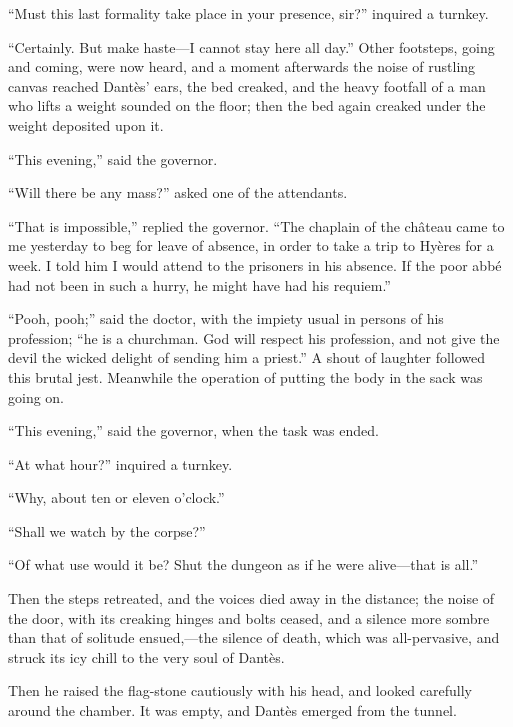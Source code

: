 “Must this last formality take place in your presence, sir?” inquired a
turnkey.

“Certainly. But make haste—I cannot stay here all day.” Other
footsteps, going and coming, were now heard, and a moment afterwards
the noise of rustling canvas reached Dantès’ ears, the bed creaked, and
the heavy footfall of a man who lifts a weight sounded on the floor;
then the bed again creaked under the weight deposited upon it.

“This evening,” said the governor.

“Will there be any mass?” asked one of the attendants.

“That is impossible,” replied the governor. “The chaplain of the
château came to me yesterday to beg for leave of absence, in order to
take a trip to Hyères for a week. I told him I would attend to the
prisoners in his absence. If the poor abbé had not been in such a
hurry, he might have had his requiem.”

“Pooh, pooh;” said the doctor, with the impiety usual in persons of his
profession; “he is a churchman. God will respect his profession, and
not give the devil the wicked delight of sending him a priest.” A shout
of laughter followed this brutal jest. Meanwhile the operation of
putting the body in the sack was going on.

“This evening,” said the governor, when the task was ended.

“At what hour?” inquired a turnkey.

“Why, about ten or eleven o’clock.”

“Shall we watch by the corpse?”

“Of what use would it be? Shut the dungeon as if he were alive—that is
all.”

Then the steps retreated, and the voices died away in the distance; the
noise of the door, with its creaking hinges and bolts ceased, and a
silence more sombre than that of solitude ensued,—the silence of death,
which was all-pervasive, and struck its icy chill to the very soul of
Dantès.

Then he raised the flag-stone cautiously with his head, and looked
carefully around the chamber. It was empty, and Dantès emerged from the
tunnel.

